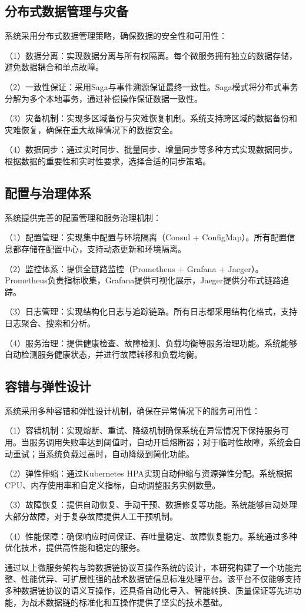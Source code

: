 \subsection{分布式数据管理与灾备}

系统采用分布式数据管理策略，确保数据的安全性和可用性：

（1）数据分离：实现数据分离与所有权隔离。每个微服务拥有独立的数据存储，避免数据耦合和单点故障。

（2）一致性保证：采用Saga与事件溯源保证最终一致性。Saga模式将分布式事务分解为多个本地事务，通过补偿操作保证数据一致性。

（3）灾备机制：实现多区域备份与灾难恢复机制。系统支持跨区域的数据备份和灾难恢复，确保在重大故障情况下的数据安全。

（4）数据同步：通过实时同步、批量同步、增量同步等多种方式实现数据同步。根据数据的重要性和实时性要求，选择合适的同步策略。

\subsection{配置与治理体系}

系统提供完善的配置管理和服务治理机制：

（1）配置管理：实现集中配置与环境隔离（Consul + ConfigMap）。所有配置信息都存储在配置中心，支持动态更新和环境隔离。

（2）监控体系：提供全链路监控（Prometheus + Grafana + Jaeger）。Prometheus负责指标收集，Grafana提供可视化展示，Jaeger提供分布式链路追踪。

（3）日志管理：实现结构化日志与追踪链路。所有日志都采用结构化格式，支持日志聚合、搜索和分析。

（4）服务治理：提供健康检查、故障检测、负载均衡等服务治理功能。系统能够自动检测服务健康状态，并进行故障转移和负载均衡。

\subsection{容错与弹性设计}

系统采用多种容错和弹性设计机制，确保在异常情况下的服务可用性：

（1）容错机制：实现熔断、重试、降级机制确保系统在异常情况下保持服务可用。当服务调用失败率达到阈值时，自动开启熔断器；对于临时性故障，系统会自动重试；当系统负载过高时，自动降级到简化功能。

（2）弹性伸缩：通过Kubernetes HPA实现自动伸缩与资源弹性分配。系统根据CPU、内存使用率和自定义指标，自动调整服务实例数量。

（3）故障恢复：提供自动恢复、手动干预、数据修复等功能。系统能够自动处理大部分故障，对于复杂故障提供人工干预机制。

（4）性能保障：确保响应时间保证、吞吐量稳定、故障恢复能力。系统通过多种优化技术，提供高性能和稳定的服务。

通过以上微服务架构与跨数据链协议互操作系统的设计，本研究构建了一个功能完整、性能优异、可扩展性强的战术数据链信息标准处理平台。该平台不仅能够支持多种数据链协议的语义互操作，还具备自动化导入、智能转换、质量保证等先进功能，为战术数据链的标准化和互操作提供了坚实的技术基础。